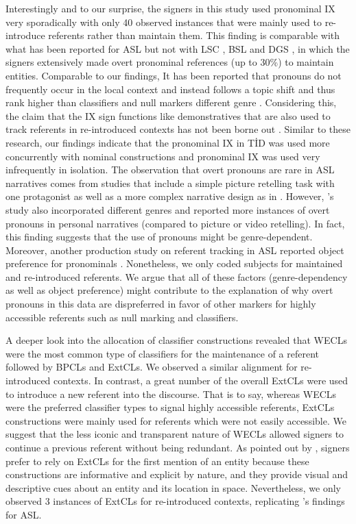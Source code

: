 \documentclass[review]{elsarticle} %
\begin{document}
Interestingly and to our surprise, the signers in this study used
pronominal IX very sporadically with only 40 observed instances that
were mainly used to re-introduce referents rather than maintain them.
This finding is comparable with what has been reported for ASL
\citep{swabey2002, frederiksen2016, czubek2017} but not with LSC
\citep{bel2015}, BSL \citep{morgan2005} and DGS \citep{perniss2015}, in
which the signers extensively made overt pronominal references (up to
30\%) to maintain entities. Comparable to our findings, It has been
reported that pronouns do not frequently occur in the local context and
instead follows a topic shift and thus rank higher than classifiers and
null markers different genre \citetext{\citealp[see][ for
LSC]{barbera2009}; \citealp[and][ for TİD]{nuhbalaoglu2018}}.
Considering this, the claim that the IX sign functions like
demonstratives that are also used to track referents in re-introduced
contexts has not been borne out \citep{koulidobrova2016}. Similar to
these research, our findings indicate that the pronominal IX in TİD was
used more concurrently with nominal constructions and pronominal IX was
used very infrequently in isolation. The observation that overt pronouns
are rare in ASL narratives comes from studies that include a simple
picture retelling task with one protagonist
\citep[e.g.,][]{frederiksen2016} as well as a more complex narrative
design as in \citep{czubek2017}. However, \citet{czubek2017}'s study
also incorporated different genres and reported more instances of overt
pronouns in personal narratives (compared to picture or video
retelling). In fact, this finding suggests that the use of pronouns
might be genre-dependent. Moreover, another production study on referent
tracking in ASL reported object preference for pronominals
\citep{frederiksen2017}. Nonetheless, we only coded subjects for
maintained and re-introduced referents. We argue that all of these
factors (genre-dependency as well as object preference) might contribute
to the explanation of why overt pronouns in this data are dispreferred
in favor of other markers for highly accessible referents such as null
marking and classifiers.

A deeper look into the allocation of classifier constructions revealed
that WECLs were the most common type of classifiers for the maintenance
of a referent followed by BPCLs and ExtCLs. We observed a similar
alignment for re-introduced contexts. In contrast, a great number of the
overall ExtCLs were used to introduce a new referent into the discourse.
That is to say, whereas WECLs were the preferred classifier types to
signal highly accessible referents, ExtCLs constructions were mainly
used for referents which were not easily accessible. We suggest that the
less iconic and transparent nature of WECLs allowed signers to continue
a previous referent without being redundant. As pointed out by
\citet{czubek2017}, signers prefer to rely on ExtCLs for the first
mention of an entity because these constructions are informative and
explicit by nature, and they provide visual and descriptive cues about
an entity and its location in space. Nevertheless, we only observed 3
instances of ExtCLs for re-introduced contexts, replicating
\citet{frederiksen2019}'s findings for ASL.
\end{document}
